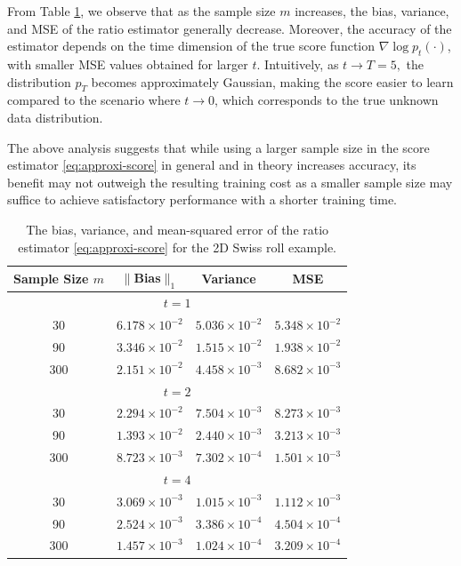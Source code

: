 \documentclass[11pt]{article}
\begin{document}
From Table \ref{table: ratio_bias_variance}, we observe that as the sample size $m$ increases, the bias, variance, and MSE of the ratio estimator generally decrease. Moreover, the accuracy of the estimator depends on the time dimension of the true score function $\nabla\log p_{t}(\cdot)$, with smaller MSE values obtained for larger $t$. Intuitively, as $t \rightarrow T=5,$ the distribution $p_T$ becomes approximately Gaussian, making the score easier to learn compared to the scenario where $t \rightarrow 0$, which corresponds to the true unknown data distribution.

 The above analysis suggests that while using a larger sample size in the score estimator \eqref{eq:approxi-score} in general and in theory  increases accuracy, its benefit may not outweigh the resulting training cost as a smaller sample size may suffice to achieve satisfactory performance with a shorter training time.



\begin{table}[h]
	\centering
	\begin{tabular}{c || c c c}
        \hline Sample Size $m$ & $\|$Bias$\|_1$ & Variance & MSE  \\\hline
        \multicolumn{4}{c}{$t=1$} \\\hline
		30 & $6.178\times10^{-2}$ & $5.036\times 10^{-2}$ & $5.348\times 10^{-2}$ \\

		90 & $3.346\times10^{-2}$  & $1.515\times 10^{-2}$& $1.938\times 10^{-2}$\\

		300 & $2.151\times10^{-2}$ & $4.458\times 10^{-3}$ & $8.682\times 10^{-3}$ \\\hline

        \multicolumn{4}{c}{$t=2$} \\\hline
        30 & $2.294\times10^{-2}$ & $7.504\times10^{-3}$ & $8.273\times10^{-3}$  \\
        90 & $1.393\times10^{-2}$  & $2.440\times 10^{-3}$ & $3.213\times 10^{-3}$\\
        300 & $8.723\times10^{-3}$ & $7.302\times10^{-4}$ & $1.501\times10^{-3}$ \\\hline

        \multicolumn{4}{c}{$t=4$} \\\hline
        30 & $3.069\times10^{-3}$ & $1.015\times10^{-3}$& $1.112\times10^{-3}$ \\	
        90 & $2.524\times10^{-3}$  & $3.386\times 10^{-4}$ & $4.504\times 10^{-4}$\\
        300 & $1.457\times10^{-3}$ & $1.024\times10^{-4}$ & $3.209\times10^{-4}$ \\	\hline
		
	\end{tabular}
	\caption{The bias, variance, and mean-squared error of the ratio estimator \eqref{eq:approxi-score} for the 2D Swiss roll example. }
	\label{table: ratio_bias_variance}
\end{table}
\end{document}
